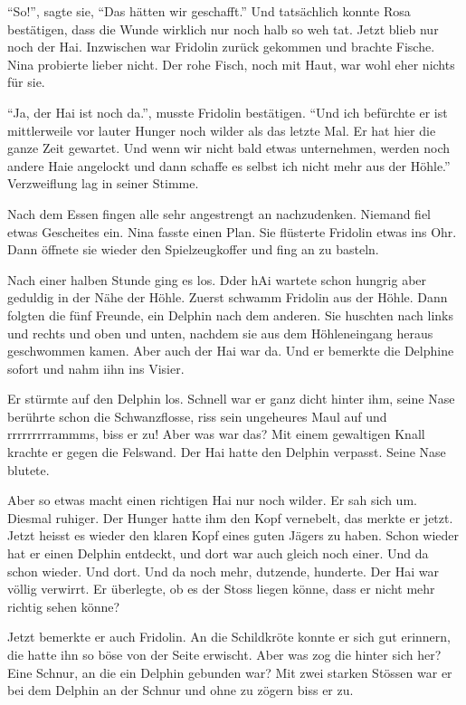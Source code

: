 \enquote{So!}, sagte sie, \enquote{Das hätten wir geschafft.} Und tatsächlich konnte Rosa bestätigen, dass die Wunde wirklich nur noch halb so weh tat. Jetzt blieb nur noch der Hai. Inzwischen war Fridolin zurück gekommen und brachte Fische. Nina probierte lieber nicht. Der rohe Fisch, noch mit Haut, war wohl eher nichts für sie.

\enquote{Ja, der Hai ist noch da.}, musste Fridolin bestätigen. \enquote{Und ich befürchte er ist mittlerweile vor lauter Hunger noch wilder als das letzte Mal. Er hat hier die ganze Zeit gewartet. Und wenn wir nicht bald etwas unternehmen, werden noch andere Haie angelockt und dann schaffe es selbst ich nicht mehr aus der Höhle.} Verzweiflung lag in seiner Stimme.

Nach dem Essen fingen alle sehr angestrengt an nachzudenken. Niemand fiel etwas Gescheites ein. Nina fasste einen Plan. Sie flüsterte Fridolin etwas ins Ohr. Dann öffnete sie wieder den Spielzeugkoffer und fing an zu basteln. 








Nach einer halben Stunde ging es los. Dder hAi wartete schon hungrig aber geduldig in der Nähe der Höhle. Zuerst schwamm Fridolin aus der Höhle. Dann folgten die fünf Freunde, ein Delphin nach dem anderen. Sie huschten nach links und rechts und oben und unten, nachdem sie aus dem Höhleneingang heraus geschwommen kamen. Aber auch der Hai war da. Und er bemerkte die Delphine sofort und nahm iihn ins Visier.

Er stürmte auf den Delphin los. Schnell war er ganz dicht hinter ihm, seine Nase berührte schon die Schwanzflosse, riss sein ungeheures Maul auf und rrrrrrrrrammms, biss er zu! Aber was war das? Mit einem gewaltigen Knall krachte er gegen die Felswand. Der Hai hatte den Delphin verpasst. Seine Nase blutete.

Aber so etwas macht einen richtigen Hai nur noch wilder. Er sah sich um. Diesmal ruhiger. Der Hunger hatte ihm den Kopf vernebelt, das merkte er jetzt. Jetzt heisst es wieder den klaren Kopf eines guten Jägers zu haben. Schon wieder hat er einen Delphin entdeckt, und dort war auch gleich noch einer. Und da schon wieder. Und dort. Und da noch mehr, dutzende, hunderte. Der Hai war völlig verwirrt. Er überlegte, ob es der Stoss liegen könne, dass er nicht mehr richtig sehen könne?

Jetzt bemerkte er auch Fridolin. An die Schildkröte konnte er sich gut erinnern, die hatte ihn so böse von der Seite erwischt. Aber was zog die hinter sich her? Eine Schnur, an die ein Delphin gebunden war? Mit zwei starken Stössen war er bei dem Delphin an der Schnur und ohne zu zögern biss er zu.

